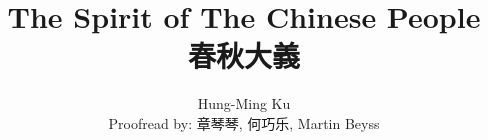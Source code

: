 \documentclass[a4paper,12pt]{book}
\begin{document}
\title{The Spirit of The Chinese People \\ 春秋大義}
\author{Hung-Ming Ku \\ Proofread by: 章琴琴, 何巧乐, Martin Beyss}

\maketitle



\tableofcontents

\frontmatter
    
    

\mainmatter
    
    
    
    
    
    
    
    \begin{appendices}
        
    \end{appendices}

    
    
\end{document}
